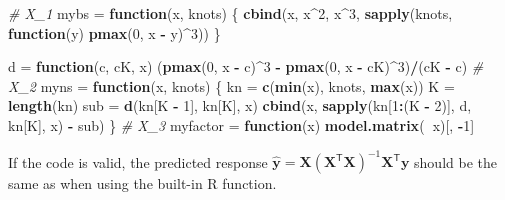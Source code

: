 \documentclass[]{article}
\newenvironment{Shaded}{\begin{snugshade}}{\end{snugshade}}
\newcommand{\KeywordTok}[1]{\textcolor[rgb]{0.13,0.29,0.53}{\textbf{#1}}}
\newcommand{\DecValTok}[1]{\textcolor[rgb]{0.00,0.00,0.81}{#1}}
\newcommand{\StringTok}[1]{\textcolor[rgb]{0.31,0.60,0.02}{#1}}
\newcommand{\CommentTok}[1]{\textcolor[rgb]{0.56,0.35,0.01}{\textit{#1}}}
\newcommand{\ControlFlowTok}[1]{\textcolor[rgb]{0.13,0.29,0.53}{\textbf{#1}}}
\newcommand{\OperatorTok}[1]{\textcolor[rgb]{0.81,0.36,0.00}{\textbf{#1}}}
\newcommand{\NormalTok}[1]{#1}
\begin{document}
\begin{Shaded}
\begin{Highlighting}[]
\CommentTok{# X_1}
\NormalTok{mybs =}\StringTok{ }\ControlFlowTok{function}\NormalTok{(x, knots) \{}
    \KeywordTok{cbind}\NormalTok{(x, x}\OperatorTok{^}\DecValTok{2}\NormalTok{, x}\OperatorTok{^}\DecValTok{3}\NormalTok{, }\KeywordTok{sapply}\NormalTok{(knots, }\ControlFlowTok{function}\NormalTok{(y) }\KeywordTok{pmax}\NormalTok{(}\DecValTok{0}\NormalTok{, x }\OperatorTok{-}\StringTok{ }\NormalTok{y)}\OperatorTok{^}\DecValTok{3}\NormalTok{))}
\NormalTok{\}}

\NormalTok{d =}\StringTok{ }\ControlFlowTok{function}\NormalTok{(c, cK, x) (}\KeywordTok{pmax}\NormalTok{(}\DecValTok{0}\NormalTok{, x }\OperatorTok{-}\StringTok{ }\NormalTok{c)}\OperatorTok{^}\DecValTok{3} \OperatorTok{-}\StringTok{ }\KeywordTok{pmax}\NormalTok{(}\DecValTok{0}\NormalTok{, x }\OperatorTok{-}\StringTok{ }\NormalTok{cK)}\OperatorTok{^}\DecValTok{3}\NormalTok{)}\OperatorTok{/}\NormalTok{(cK }\OperatorTok{-}\StringTok{ }\NormalTok{c)}
\CommentTok{# X_2}
\NormalTok{myns =}\StringTok{ }\ControlFlowTok{function}\NormalTok{(x, knots) \{}
\NormalTok{    kn =}\StringTok{ }\KeywordTok{c}\NormalTok{(}\KeywordTok{min}\NormalTok{(x), knots, }\KeywordTok{max}\NormalTok{(x))}
\NormalTok{    K =}\StringTok{ }\KeywordTok{length}\NormalTok{(kn)}
\NormalTok{    sub =}\StringTok{ }\KeywordTok{d}\NormalTok{(kn[K }\OperatorTok{-}\StringTok{ }\DecValTok{1}\NormalTok{], kn[K], x)}
    \KeywordTok{cbind}\NormalTok{(x, }\KeywordTok{sapply}\NormalTok{(kn[}\DecValTok{1}\OperatorTok{:}\NormalTok{(K }\OperatorTok{-}\StringTok{ }\DecValTok{2}\NormalTok{)], d, kn[K], x) }\OperatorTok{-}\StringTok{ }\NormalTok{sub)}
\NormalTok{\}}
\CommentTok{# X_3}
\NormalTok{myfactor =}\StringTok{ }\ControlFlowTok{function}\NormalTok{(x) }\KeywordTok{model.matrix}\NormalTok{(}\OperatorTok{~}\NormalTok{x)[, }\OperatorTok{-}\DecValTok{1}\NormalTok{]}
\end{Highlighting}
\end{Shaded}

If the code is valid, the predicted response
\(\hat{\mathbf y} = \mathbf X(\mathbf X^\mathsf{T} \mathbf X)^{-1} \mathbf X^\mathsf{T} \mathbf y\)
should be the same as when using the built-in R function.
\end{document}
